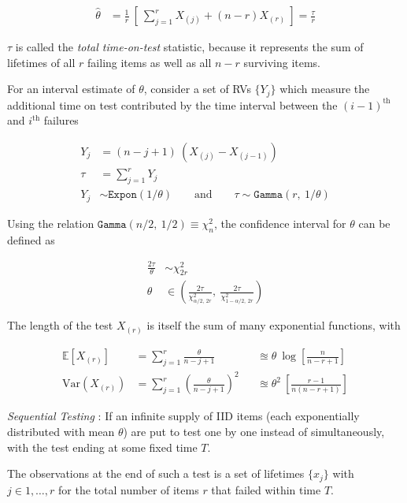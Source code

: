 \begin{align}
	\widehat{\theta} &= \frac{1}{r}\ \left[\ \sum\limits_{j=1}^{r} X_{(j)} + (n-r)X_{(r)}\ \right] = \frac{\tau}{r}
\end{align}

$\tau$ is called the \textit{total time-on-test} statistic, because it represents the sum of lifetimes of all $r$ failing items as well as all $n-r$ surviving items.

For an interval estimate of $\theta$, consider a set of RVs $\{Y_j\}$ which measure the additional time on test contributed by the time interval between the $(i-1)^{\text{th}}$ and $i^{\text{th}}$ failures

\begin{align}
	Y_j &= (n-j+1)\ (X_{(j)} - X_{(j-1)}) \\
	\tau &= \sum\limits_{j=1}^{r} Y_j \\
	Y_j &\sim \texttt{Expon}(1/\theta) \qquad \text{and} \qquad \tau \sim \texttt{Gamma}(r,\ 1/\theta)
\end{align}

Using the relation $ \texttt{Gamma}(n/2,\ 1/2) \equiv \chi^2_n$, the confidence interval for $\theta$ can be defined as

\begin{align}
	\frac{2\tau}{\theta} &\sim \chi^2_{2r} \\
	\theta &\in \left( \frac{2\tau}{\chi^2_{\alpha/2,\ 2r}},\ \frac{2\tau}{\chi^2_{1 - \alpha/2,\ 2r}} \right)
\end{align}

The length of the test $X_{(r)}$ is itself the sum of many exponential functions, with

\begin{align}
	\mathbb{E}[X_{(r)}] &= \sum\limits_{j=1}^{r} \frac{\theta}{n-j+1} &&\approxeq  \theta \ \log \left[ \frac{n}{n-r+1} \right] \\
	\mathrm{Var}(X_{(r)}) &= \sum\limits_{j=1}^{r} \left(\frac{\theta}{n-j+1}\right)^2 &&\approxeq \theta^2\ \left[ \frac{r-1}{n(n-r+1)} \right]
\end{align}

\textit{Sequential Testing} : If an infinite supply of IID items (each exponentially distributed with mean $\theta$) are put to test one by one instead of simultaneously, with the test ending at some fixed time \(T\).

The observations at the end of such a test is a set of lifetimes \(\{x_j\}\) with \(j \in 1, \dots, r\) for the total number of items \(r\) that failed within time \(T\).

